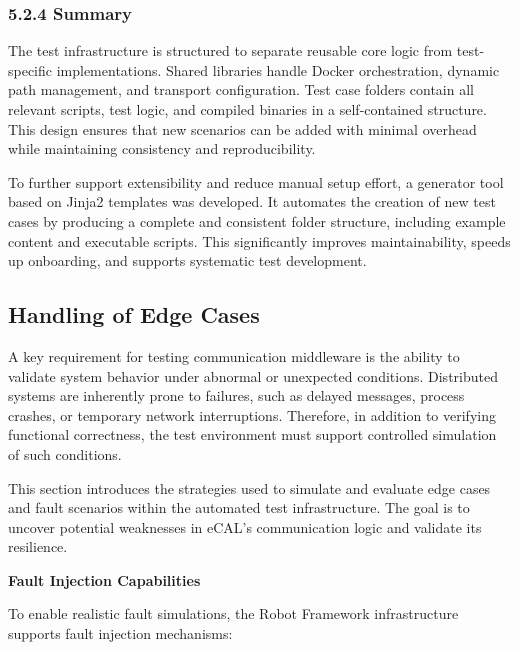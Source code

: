 \vspace{1em}
\subsubsection*{5.2.4 Summary}

The test infrastructure is structured to separate reusable core logic from test-specific implementations. Shared libraries handle Docker orchestration, dynamic path management, and transport configuration. Test case folders contain all relevant scripts, test logic, and compiled binaries in a self-contained structure. This design ensures that new scenarios can be added with minimal overhead while maintaining consistency and reproducibility.

\vspace{1em}
To further support extensibility and reduce manual setup effort, a generator tool based on Jinja2 templates was developed. It automates the creation of new test cases by producing a complete and consistent folder structure, including example content and executable scripts. This significantly improves maintainability, speeds up onboarding, and supports systematic test development.

\clearpage
\subsection{Handling of Edge Cases}

A key requirement for testing communication middleware is the ability to validate system behavior under abnormal or unexpected conditions. Distributed systems are inherently prone to failures, such as delayed messages, process crashes, or temporary network interruptions. Therefore, in addition to verifying functional correctness, the test environment must support controlled simulation of such conditions.

\vspace{1em}
This section introduces the strategies used to simulate and evaluate edge cases and fault scenarios within the automated test infrastructure. The goal is to uncover potential weaknesses in eCAL’s communication logic and validate its resilience.

\vspace{1em}
\textbf{Fault Injection Capabilities}

\vspace{0.4em}
To enable realistic fault simulations, the Robot Framework infrastructure supports fault injection mechanisms:

